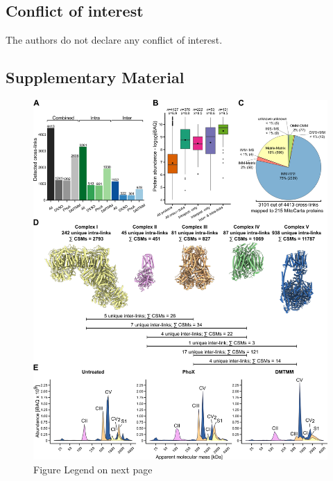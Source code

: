 \subsection*{Conflict of interest}
The authors do not declare any conflict of interest.
%
\clearpage
\begin{subappendices}
    \section{Supplementary Material}
    \begin{figure}[hb!]
        \center
        \includegraphics[]{Chapter.3/Figures/SI_Figure1.png}
        \caption{Figure Legend on next page}
        \label{fig:ch3_app_fig1}
    \end{figure}
    \addtocounter{figure}{-1}
    \begin{figure}[ht!]

\end{figure}
\end{subappendices}
